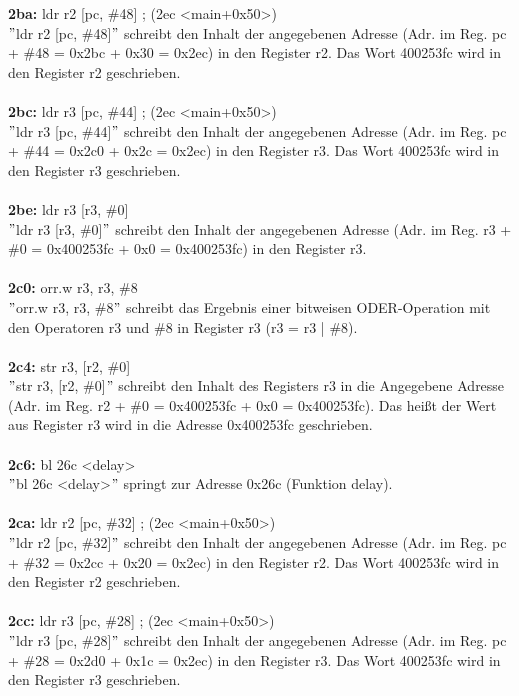 \textbf{2ba:} ldr r2 [pc, \#48] ; (2ec <main+0x50>)\\
$"$ldr r2 [pc, \#48]$"$ schreibt den Inhalt der angegebenen Adresse (Adr. im Reg. pc + \#48 = 0x2bc + 0x30 = 0x2ec) in den Register r2. Das Wort 400253fc wird in den Register r2 geschrieben.\\ \\
\textbf{2bc:} ldr r3 [pc, \#44] ; (2ec <main+0x50>)\\
$"$ldr r3 [pc, \#44]$"$ schreibt den Inhalt der angegebenen Adresse (Adr. im Reg. pc + \#44 = 0x2c0 + 0x2c = 0x2ec) in den Register r3. Das Wort 400253fc wird in den Register r3 geschrieben.\\ \\
\textbf{2be:} ldr r3 [r3, \#0]\\
$"$ldr r3 [r3, \#0]$"$ schreibt den Inhalt der angegebenen Adresse (Adr. im Reg. r3 + \#0 = 0x400253fc + 0x0 = 0x400253fc) in den Register r3.\\ \\
\textbf{2c0:} orr.w r3, r3, \#8\\
$"$orr.w r3, r3, \#8$"$ schreibt das Ergebnis einer bitweisen ODER-Operation mit den Operatoren r3 und \#8 in Register r3 (r3 = r3 | \#8).\\ \\
\textbf{2c4:} str r3, [r2, \#0]\\
$"$str r3, [r2, \#0]$"$ schreibt den Inhalt des Registers r3 in die Angegebene Adresse (Adr. im Reg. r2 + \#0 = 0x400253fc + 0x0 = 0x400253fc). Das hei\ss{}t der Wert aus Register r3 wird in die Adresse 0x400253fc geschrieben.\\ \\
\textbf{2c6:} bl 26c <delay>\\
$"$bl 26c <delay>$"$ springt zur Adresse 0x26c (Funktion delay).\\ \\
\textbf{2ca:} ldr r2 [pc, \#32] ; (2ec <main+0x50>)\\
$"$ldr r2 [pc, \#32]$"$ schreibt den Inhalt der angegebenen Adresse (Adr. im Reg. pc + \#32 = 0x2cc + 0x20 = 0x2ec) in den Register r2. Das Wort 400253fc wird in den Register r2 geschrieben.\\ \\
\textbf{2cc:} ldr r3 [pc, \#28] ; (2ec <main+0x50>)\\
$"$ldr r3 [pc, \#28]$"$ schreibt den Inhalt der angegebenen Adresse (Adr. im Reg. pc + \#28 = 0x2d0 + 0x1c = 0x2ec) in den Register r3. Das Wort 400253fc wird in den Register r3 geschrieben.\\ \\
